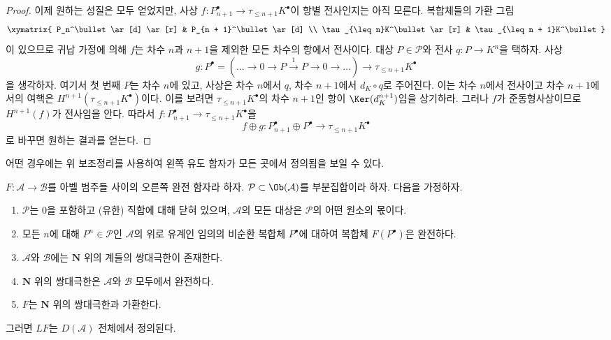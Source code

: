 \begin{proof}
\medskip\noindent
이제 원하는 성질은 모두 얻었지만, 사상
$f : P_{n + 1}^\bullet \to \tau_{\leq n + 1}K^\bullet$이
항별 전사인지는 아직 모른다. 복합체들의 가환 그림
$$
\xymatrix{
P_n^\bullet \ar[d] \ar[r] & P_{n + 1}^\bullet \ar[d] \\
\tau_{\leq n}K^\bullet \ar[r] & \tau_{\leq n + 1}K^\bullet
}
$$
이 있으므로 귀납 가정에 의해 $f$는 차수 $n$과 $n + 1$을 제외한
모든 차수의 항에서 전사이다. 대상 $P \in \mathcal{P}$와 전사
$q : P \to K^n$을 택하자. 사상
$$
g :
P^\bullet = (\ldots \to 0 \to P \xrightarrow{1} P \to 0 \to \ldots)
\longrightarrow
\tau_{\leq n + 1}K^\bullet
$$
을 생각하자. 여기서 첫 번째 $P$는 차수 $n$에 있고, 사상은 차수
$n$에서 $q$, 차수 $n + 1$에서 $d_K \circ q$로 주어진다.
이는 차수 $n$에서 전사이고 차수 $n + 1$에서의 여핵은
$H^{n + 1}(\tau_{\leq n + 1}K^\bullet)$이다. 이를 보려면
$\tau_{\leq n + 1}K^\bullet$의 차수 $n + 1$인 항이
$\Ker(d_K^{n + 1})$임을 상기하라. 그러나 $f$가 준동형사상이므로
$H^{n + 1}(f)$가 전사임을 안다. 따라서
$f : P_{n + 1}^\bullet \to \tau_{\leq n + 1}K^\bullet$을
$$
f \oplus g : P_{n + 1}^\bullet \oplus P^\bullet \to \tau_{\leq n + 1}K^\bullet
$$
로 바꾸면 원하는 결과를 얻는다.
\end{proof}

\noindent
어떤 경우에는 위 보조정리를 사용하여 왼쪽 유도 함자가 모든 곳에서
정의됨을 보일 수 있다.

\begin{proposition}
\label{proposition-left-derived-exists}
$F : \mathcal{A} \to \mathcal{B}$를 아벨 범주들 사이의 오른쪽 완전
함자라 하자. $\mathcal{P} \subset \Ob(\mathcal{A})$를 부분집합이라 하자.
다음을 가정하자.
\begin{enumerate}
\item $\mathcal{P}$는 $0$을 포함하고 (유한) 직합에 대해 닫혀 있으며,
$\mathcal{A}$의 모든 대상은 $\mathcal{P}$의 어떤 원소의 몫이다.
\item 모든 $n$에 대해 $P^n \in \mathcal{P}$인 $\mathcal{A}$의
위로 유계인 임의의 비순환 복합체 $P^\bullet$에 대하여
복합체 $F(P^\bullet)$은 완전하다.
\item $\mathcal{A}$와 $\mathcal{B}$에는 $\mathbf{N}$ 위의 계들의
쌍대극한이 존재한다.
\item $\mathbf{N}$ 위의 쌍대극한은 $\mathcal{A}$와 $\mathcal{B}$
모두에서 완전하다.
\item $F$는 $\mathbf{N}$ 위의 쌍대극한과 가환한다.
\end{enumerate}
그러면 $LF$는 $D(\mathcal{A})$ 전체에서 정의된다.
\end{proposition}


